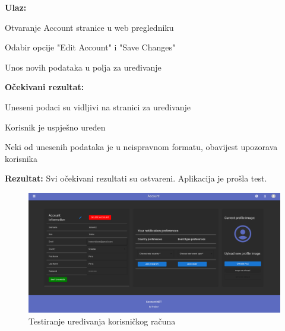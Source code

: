 			\noindent {}
			\begin{packed_item}

				\item  \textbf{Ulaz:}
				\item[] \begin{packed_enum}

					\item Otvaranje Account stranice u web pregledniku
					\item Odabir opcije "Edit Account" i "Save Changes"
					\item Unos novih podataka u polja za uređivanje

				\end{packed_enum}
				
				\item  \textbf{Očekivani rezultat:}
				\item[] \begin{packed_item}
				\item[1] Uneseni podaci su vidljivi na stranici za uređivanje
				\item[2.a] Korisnik je uspješno uređen
				\item[2.b] Neki od unesenih podataka je u neispravnom formatu, obavijest upozorava korisnika
				\end{packed_item}

				\item  \textbf{Rezultat:} Svi očekivani rezultati su ostvareni. Aplikacija je prošla test.

				\begin{figure}[htbp]
					\centering
					\includegraphics[width=1\textwidth]{slike/selenium_test_2.png}
					\caption{Testiranje uređivanja korisničkog računa}
				\label{fig:my_image}
				\end{figure}
			\end{packed_item}

